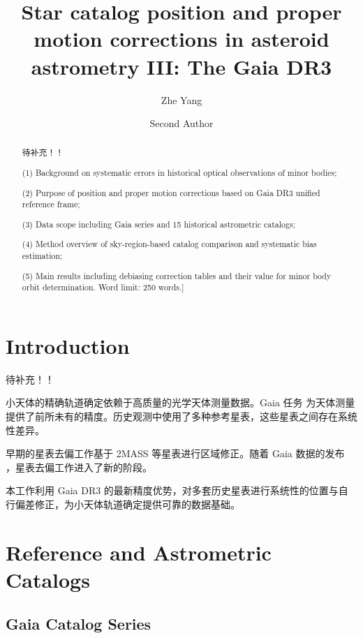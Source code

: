 \documentclass{aastex701}
\begin{document}
\title{Star catalog position and proper motion corrections in asteroid astrometry III: The Gaia DR3}

\author{Zhe Yang}

\author{Second Author}

\begin{abstract}
    待补充！！
    
(1) Background on systematic errors in historical optical observations of minor bodies; 

(2) Purpose of position and proper motion corrections based on Gaia DR3 unified reference frame; 

(3) Data scope including Gaia series and 15 historical astrometric catalogs; 

(4) Method overview of sky-region-based catalog comparison and systematic bias estimation; 

(5) Main results including debiasing correction tables and their value for minor body orbit determination. Word limit: 250 words.]

\end{abstract}


\section{Introduction} \label{sec:intro}
待补充！！

小天体的精确轨道确定依赖于高质量的光学天体测量数据。Gaia 任务 \citep{2022ApJ...935..167A} 为天体测量提供了前所未有的精度。历史观测中使用了多种参考星表，这些星表之间存在系统性差异。

早期的星表去偏工作基于 2MASS 等星表进行区域修正。随着 Gaia 数据的发布 \citep{2018AJ....156..123A}，星表去偏工作进入了新的阶段。

本工作利用 Gaia DR3 的最新精度优势，对多套历史星表进行系统性的位置与自行偏差修正，为小天体轨道确定提供可靠的数据基础。

\section{Reference and Astrometric Catalogs} \label{sec:catalogs}
\subsection{Gaia Catalog Series} \label{subsec:gaia}
\end{document}

